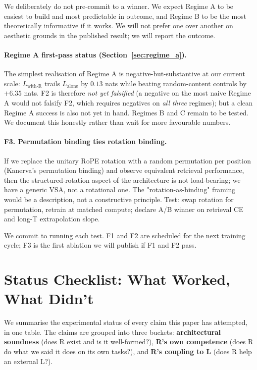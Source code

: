 \documentclass[10pt, twocolumn, a4paper]{article}
\begin{document}
We deliberately do not pre-commit to a winner. We expect Regime A to be easiest to build and most predictable in outcome, and Regime B to be the most theoretically informative if it works. We will not prefer one over another on aesthetic grounds in the published result; we will report the outcome.

\paragraph{Regime A first-pass status (Section~\ref{sec:regime_a}).} The simplest realisation of Regime A is negative-but-substantive at our current scale: $L_{\text{with-R}}$ trails $L_{\text{alone}}$ by $0.13$ nats while beating random-content controls by $+6.35$ nats. F2 is therefore \emph{not yet falsified} (a negative on the most naive Regime A would not falsify F2, which requires negatives on \emph{all three} regimes); but a clean Regime A success is also not yet in hand. Regimes B and C remain to be tested. We document this honestly rather than wait for more favourable numbers.

\paragraph{F3. Permutation binding ties rotation binding.} If we replace the unitary RoPE rotation with a random permutation per position (Kanerva's permutation binding) and observe equivalent retrieval performance, then the structured-rotation aspect of the architecture is not load-bearing; we have a generic VSA, not a rotational one. The "rotation-as-binding" framing would be a description, not a constructive principle. Test: swap rotation for permutation, retrain at matched compute; declare A/B winner on retrieval CE and long-T extrapolation slope.

We commit to running each test. F1 and F2 are scheduled for the next training cycle; F3 is the first ablation we will publish if F1 and F2 pass.


\section{Status Checklist: What Worked, What Didn't}
\label{sec:checklist}

We summarise the experimental status of every claim this paper has
attempted, in one table. The claims are grouped into three buckets:
\textbf{architectural soundness} (does R exist and is it well-formed?),
\textbf{R's own competence} (does R do what we said it does on its own
tasks?), and \textbf{R's coupling to L} (does R help an external L?).
\end{document}
